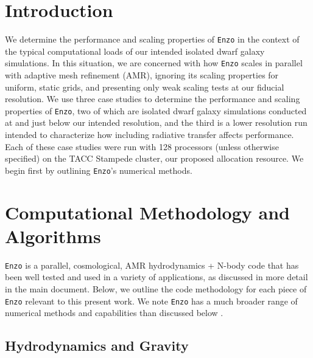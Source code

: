 \documentclass[11pt]{article}
\begin{document}
\maketitle



\section{Introduction}

We determine the performance and scaling properties of \texttt{Enzo} in the context of the typical computational loads of our intended isolated dwarf galaxy simulations. In this situation, we are concerned with how \texttt{Enzo} scales in parallel with adaptive mesh refinement (AMR), ignoring its scaling properties for uniform, static grids, and presenting only weak scaling tests at our fiducial resolution. We use three case studies to determine the performance and scaling properties of \texttt{Enzo}, two of which are isolated dwarf galaxy simulations conducted at and just below our intended resolution, and the third is a lower resolution run intended to characterize how including radiative transfer affects performance. Each of these case studies were run with 128 processors (unless otherwise specified) on the TACC Stampede cluster, our proposed allocation resource. We begin first by outlining \texttt{Enzo}'s numerical methods.

\section{Computational Methodology and Algorithms}

\texttt{Enzo} is a parallel, cosmological, AMR hydrodynamics + N-body code that has been well tested and used in a variety of applications, as discussed in more detail in the main document. Below, we outline the code methodology for each piece of \texttt{Enzo} relevant to this present work. We note \texttt{Enzo} has a much broader range of numerical methods and capabilities than discussed below \citep[see ][ for a detailed description of all methods]{Enzo2014}. 

\subsection{Hydrodynamics and Gravity}
\end{document}
